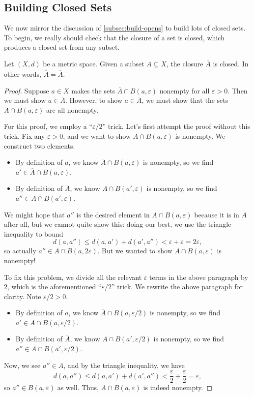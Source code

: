 \documentclass[../main.tex]{subfiles}
\begin{document}
\subsection{Building Closed Sets}
We now mirror the discussion of \cref{subsec:build-opens} to build lots of closed sets. To begin, we really should check that the closure of a set is closed, which produces a closed set from any subset.
\begin{proposition} \label{prop:cl-is-closed}
    Let $(X,d)$ be a metric space. Given a subset $A\subseteq X$, the closure $\overline A$ is closed. In other words, $\overline{\overline A}=\overline A$.
\end{proposition}
\begin{proof}
    Suppose $a\in X$ makes the sets $\overline A\cap B(a,\varepsilon)$ nonempty for all $\varepsilon>0$. Then we must show $a\in\overline A$. However, to show $a\in\overline A$, we must show that the sets $A\cap B(a,\varepsilon)$ are all nonempty.

    For this proof, we employ a ``$\varepsilon/2$'' trick. Let's first attempt the proof without this trick. Fix any $\varepsilon>0$, and we want to show $A\cap B(a,\varepsilon)$ is nonempty. We construct two elements.
    \begin{itemize}
        \item By definition of $a$, we know $\overline A\cap B(a,\varepsilon)$ is nonempty, so we find $a'\in\overline A\cap B(a,\varepsilon)$.
        \item By definition of $\overline A$, we know $ A\cap B(a',\varepsilon)$ is nonempty, so we find $a''\in A\cap B(a',\varepsilon)$.
    \end{itemize}
    We might hope that $a''$ is the desired element in $A\cap B(a,\varepsilon)$ because it is in $A$ after all, but we cannot quite show this: doing our best, we use the triangle inequality to bound
    \[d(a,a'')\le d(a,a')+d(a',a'')<\varepsilon+\varepsilon=2\varepsilon,\]
    so actually $a''\in A\cap B(a,2\varepsilon)$. But we wanted to show $A\cap B(a,\varepsilon)$ is nonempty!

    To fix this problem, we divide all the relevant $\varepsilon$ terms in the above paragraph by $2$, which is the aforementioned ``$\varepsilon/2$'' trick. We rewrite the above paragraph for clarity. Note $\varepsilon/2>0$.
    \begin{itemize}
        \item By definition of $a$, we know $\overline A\cap B(a,\varepsilon/2)$ is nonempty, so we find $a'\in\overline A\cap B(a,\varepsilon/2)$.
        \item By definition of $\overline A$, we know $ A\cap B(a',\varepsilon/2)$ is nonempty, so we find $a''\in A\cap B(a',\varepsilon/2)$.
    \end{itemize}
    Now, we see $a''\in A$, and by the triangle inequality, we have
    \[d(a,a'')\le d(a,a')+d(a',a'')<\frac\varepsilon2+\frac\varepsilon2=\varepsilon,\]
    so $a''\in B(a,\varepsilon)$ as well. Thus, $A\cap B(a,\varepsilon)$ is indeed nonempty.
\end{proof}
\end{document}

